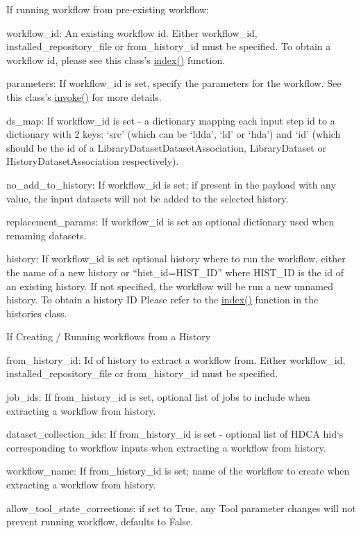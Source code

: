 If running workflow from pre-\/existing workflow\-:
\begin{DoxyItemize}
\item workflow\-\_\-id\-: An existing workflow id. Either workflow\-\_\-id, installed\-\_\-repository\-\_\-file or from\-\_\-history\-\_\-id must be specified. To obtain a workflow id, please see this class's \hyperlink{classGalaxyWorkflows_a98191c8d0819151ed0e1fcf926edda93}{index()} function.
\item parameters\-: If workflow\-\_\-id is set, specify the parameters for the workflow. See this class's \hyperlink{classGalaxyWorkflows_ac2e76982f5666761dd1ed95654b57834}{invoke()} for more details.
\item ds\-\_\-map\-: If workflow\-\_\-id is set -\/ a dictionary mapping each input step id to a dictionary with 2 keys\-: ‘src’ (which can be ‘ldda’, ‘ld’ or ‘hda’) and ‘id’ (which should be the id of a Library\-Dataset\-Dataset\-Association, Library\-Dataset or History\-Dataset\-Association respectively).
\item no\-\_\-add\-\_\-to\-\_\-history\-: If workflow\-\_\-id is set; if present in the payload with any value, the input datasets will not be added to the selected history.
\item replacement\-\_\-params\-: If workflow\-\_\-id is set an optional dictionary used when renaming datasets.
\item history\-: If workflow\-\_\-id is set optional history where to run the workflow, either the name of a new history or “hist\-\_\-id=H\-I\-S\-T\-\_\-\-I\-D” where H\-I\-S\-T\-\_\-\-I\-D is the id of an existing history. If not specified, the workflow will be run a new unnamed history. To obtain a history I\-D Please refer to the \hyperlink{classGalaxyWorkflows_a98191c8d0819151ed0e1fcf926edda93}{index()} function in the histories class.
\end{DoxyItemize}

If Creating / Running workflows from a History
\begin{DoxyItemize}
\item from\-\_\-history\-\_\-id\-: Id of history to extract a workflow from. Either workflow\-\_\-id, installed\-\_\-repository\-\_\-file or from\-\_\-history\-\_\-id must be specified.
\item job\-\_\-ids\-: If from\-\_\-history\-\_\-id is set, optional list of jobs to include when extracting a workflow from history.
\item dataset\-\_\-collection\-\_\-ids\-: If from\-\_\-history\-\_\-id is set -\/ optional list of H\-D\-C\-A hid`s corresponding to workflow inputs when extracting a workflow from history.
\item workflow\-\_\-name\-: If from\-\_\-history\-\_\-id is set; name of the workflow to create when extracting a workflow from history.
\item allow\-\_\-tool\-\_\-state\-\_\-corrections\-: if set to True, any Tool parameter changes will not prevent running workflow, defaults to False.
\end{DoxyItemize}

